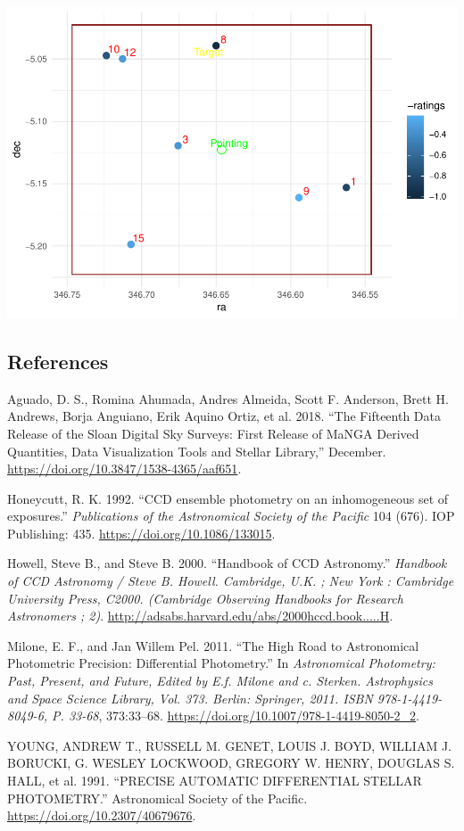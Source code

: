 \documentclass[]{elsarticle} %
\makeatletter
\def\maxwidth{\ifdim\Gin@nat@width>\linewidth\linewidth
\else\Gin@nat@width\fi}
\let\Oldincludegraphics\includegraphics
\renewcommand{\includegraphics}[1]{\Oldincludegraphics[width=\maxwidth]{#1}}
\makeatother
\begin{document}
\includegraphics{Locus_Whole_files/figure-latex/locus_plot-1.pdf}

\newpage

\hypertarget{references}{%
\subsection*{References}\label{references}}

\hypertarget{refs}{}
\leavevmode\hypertarget{ref-Aguado2018}{}%
Aguado, D. S., Romina Ahumada, Andres Almeida, Scott F. Anderson, Brett
H. Andrews, Borja Anguiano, Erik Aquino Ortiz, et al. 2018. ``The
Fifteenth Data Release of the Sloan Digital Sky Surveys: First Release
of MaNGA Derived Quantities, Data Visualization Tools and Stellar
Library,'' December. \url{https://doi.org/10.3847/1538-4365/aaf651}.

\leavevmode\hypertarget{ref-Honeycutt1992}{}%
Honeycutt, R. K. 1992. ``CCD ensemble photometry on an inhomogeneous set
of exposures.'' \emph{Publications of the Astronomical Society of the
Pacific} 104 (676). IOP Publishing: 435.
\url{https://doi.org/10.1086/133015}.

\leavevmode\hypertarget{ref-Howell2000}{}%
Howell, Steve B., and Steve B. 2000. ``Handbook of CCD Astronomy.''
\emph{Handbook of CCD Astronomy / Steve B. Howell. Cambridge, U.K. ; New
York : Cambridge University Press, C2000. (Cambridge Observing Handbooks
for Research Astronomers ; 2)}.
\url{http://adsabs.harvard.edu/abs/2000hccd.book.....H}.

\leavevmode\hypertarget{ref-Milone2011}{}%
Milone, E. F., and Jan Willem Pel. 2011. ``The High Road to Astronomical
Photometric Precision: Differential Photometry.'' In \emph{Astronomical
Photometry: Past, Present, and Future, Edited by E.f. Milone and c.
Sterken. Astrophysics and Space Science Library, Vol. 373. Berlin:
Springer, 2011. ISBN 978-1-4419-8049-6, P. 33-68}, 373:33--68.
\url{https://doi.org/10.1007/978-1-4419-8050-2_2}.

\leavevmode\hypertarget{ref-YOUNG1991}{}%
YOUNG, ANDREW T., RUSSELL M. GENET, LOUIS J. BOYD, WILLIAM J. BORUCKI,
G. WESLEY LOCKWOOD, GREGORY W. HENRY, DOUGLAS S. HALL, et al. 1991.
``PRECISE AUTOMATIC DIFFERENTIAL STELLAR PHOTOMETRY.'' Astronomical
Society of the Pacific. \url{https://doi.org/10.2307/40679676}.
\end{document}
